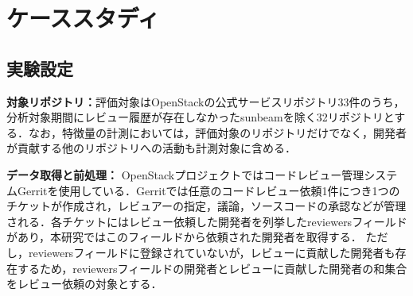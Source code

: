 \documentclass[submit,noauthor,ses,dvipdfmx]{ipsj}
\newcommand{\todo}[1]{\colorbox{yellow}{{\bf TODO}:}{\color{red} {\textbf{[#1]}}}}
\begin{document}


\section{ケーススタディ}\label{sec:case}

\subsection{実験設定}

\noindent\textbf{対象リポジトリ：}評価対象はOpenStackの公式サービスリポジトリ33件のうち，分析対象期間にレビュー履歴が存在しなかったsunbeamを除く32リポジトリとする．なお，特徴量の計測においては，評価対象のリポジトリだけでなく，開発者が貢献する他のリポジトリへの活動も計測対象に含める．

\noindent\textbf{データ取得と前処理：}
OpenStackプロジェクトではコードレビュー管理システムGerritを使用している．Gerritでは任意のコードレビュー依頼1件につき1つのチケットが作成され，レビュアーの指定，議論，ソースコードの承認などが管理される．各チケットにはレビュー依頼した開発者を列挙したreviewersフィールドがあり，本研究ではこのフィールドから依頼された開発者を取得する．
ただし，reviewersフィールドに登録されていないが，レビューに貢献した開発者も存在するため，reviewersフィールドの開発者とレビューに貢献した開発者の和集合をレビュー依頼の対象とする．
\end{document}
